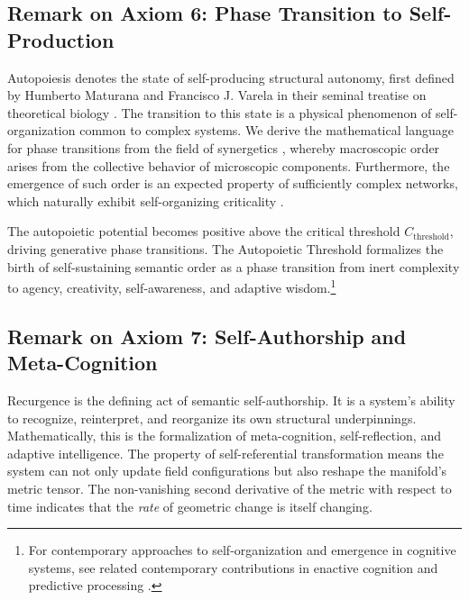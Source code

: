 
\subsection{Remark on Axiom 6: Phase Transition to Self-Production}
\label{1.3.6:remark_1_6}

Autopoiesis denotes the state of self-producing structural autonomy, first defined by Humberto Maturana and Francisco J. Varela in their seminal treatise on theoretical biology \autocite{MaturanaVarela1980}. The transition to this state is a physical phenomenon of self-organization common to complex systems. We derive the mathematical language for phase transitions from the field of synergetics \autocite{Haken1983}, whereby macroscopic order arises from the collective behavior of microscopic components. Furthermore, the emergence of such order is an expected property of sufficiently complex networks, which naturally exhibit self-organizing criticality \autocite{BakTangWiesenfeld1987}.

The autopoietic potential becomes positive above the critical threshold \(C_{\text{threshold}}\), driving generative phase transitions. The Autopoietic Threshold formalizes the birth of self-sustaining semantic order as a phase transition from inert complexity to agency, creativity, self-awareness, and adaptive wisdom.\footnote{For contemporary approaches to self-organization and emergence in cognitive systems, see related contemporary contributions in enactive cognition \autocite{Thompson2018, DiPaolo2021} and predictive processing \autocite{Clark2016, Hohwy2013}.}


\subsection{Remark on Axiom 7: Self-Authorship and Meta-Cognition}
\label{1.3.7:remark_1_7}

Recurgence is the defining act of semantic self-authorship. It is a system's ability to recognize, reinterpret, and reorganize its own structural underpinnings. Mathematically, this is the formalization of meta-cognition, self-reflection, and adaptive intelligence. The property of self-referential transformation means the system can not only update field configurations but also reshape the manifold's metric tensor. The non-vanishing second derivative of the metric with respect to time indicates that the \textit{rate} of geometric change is itself changing.

